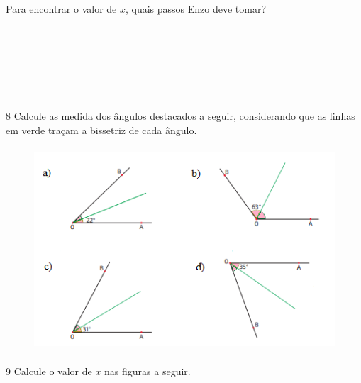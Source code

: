 Para encontrar o valor de $x$, quais passos Enzo deve tomar?

\\
\\
\\
\\
\\
\\



\num{8} Calcule as medida dos ângulos destacados a seguir, considerando que as
linhas em verde traçam a bissetriz de cada ângulo.

\begin{figure}[H]
\centering\includegraphics[width=4.66667in,height=3in]{./imgSAEB_8_MAT/media/image32.png}
\end{figure}



\num{9} Calcule o valor de $x$ nas figuras a seguir.

